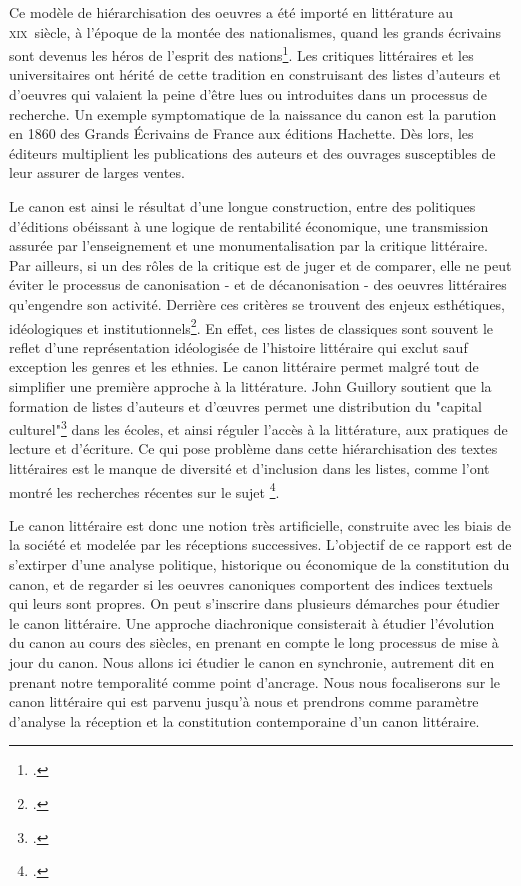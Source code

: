 \documentclass[a4paper,twoside,12pt]{book}
\begin{document}
Ce modèle de hiérarchisation des oeuvres a été importé en littérature au  \textsc{xix}\ieme ~siècle, à l'époque de la montée des nationalismes, \og quand les grands écrivains sont devenus les héros de l'esprit des nations\fg\footcites{compagnon_demon_2007}. Les critiques littéraires et les universitaires ont hérité de cette tradition en construisant des listes d'auteurs et d'oeuvres qui valaient la peine d'être lues ou introduites dans un processus de recherche. Un exemple symptomatique de la naissance du canon est la parution en 1860 des \og Grands Écrivains de France\fg{} aux éditions Hachette. Dès lors, les éditeurs multiplient les publications des auteurs et des ouvrages susceptibles de leur assurer de larges ventes. 

Le canon est ainsi le résultat d'une longue construction, entre des politiques d'éditions obéissant à une logique de rentabilité économique, une transmission assurée par l'enseignement et une monumentalisation par la critique littéraire. Par ailleurs, si un des rôles de la critique est de juger et de comparer, elle ne peut éviter le processus de canonisation - et de décanonisation - des oeuvres littéraires qu'engendre son activité. Derrière ces critères se trouvent des enjeux esthétiques, idéologiques et institutionnels\footcites{lucken_canon_2019}. En effet, ces listes de classiques sont souvent le reflet d'une représentation idéologisée de l'histoire littéraire qui exclut sauf exception les genres et les ethnies. Le canon littéraire permet malgré tout de simplifier une première approche à la littérature. John Guillory soutient que la formation de listes d'auteurs et d'œuvres permet une distribution du "capital culturel"\footcites{guillory_cultural_1993} dans les écoles, et ainsi réguler l'accès à la littérature, aux pratiques de lecture et d'écriture. Ce qui pose problème dans cette hiérarchisation des textes littéraires est le manque de diversité et d'inclusion dans les listes, comme l'ont montré les recherches récentes sur le sujet \footcites{gonzalez_measuring_2021}.

Le canon littéraire est donc une notion très artificielle, construite avec les biais de la société et modelée par les réceptions successives. L'objectif de ce rapport est de s'extirper d'une analyse politique, historique ou économique de la constitution du canon, et de regarder si les oeuvres canoniques comportent des indices textuels qui leurs sont propres. On peut s'inscrire dans plusieurs démarches pour étudier le canon littéraire. Une approche diachronique consisterait à étudier l'évolution du canon au cours des siècles, en prenant en compte le long processus de mise à jour du canon. Nous allons ici étudier le canon en synchronie, autrement dit en prenant notre temporalité comme point d'ancrage. Nous nous focaliserons sur le canon littéraire qui est parvenu jusqu'à nous et prendrons comme paramètre d'analyse la réception et la constitution contemporaine d'un canon littéraire.
\end{document}
